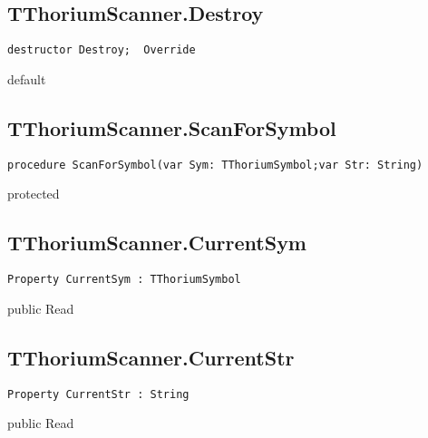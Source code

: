 \subsection{TThoriumScanner.Destroy}
\label{thoriumcorepkg:thorium:tthoriumscanner:destroy}
\begin{FPCList}
\Declaration 

\begin{verbatim}
destructor Destroy;  Override
\end{verbatim}
\Visibility
default
\end{FPCList}
\subsection{TThoriumScanner.ScanForSymbol}
\label{thoriumcorepkg:thorium:tthoriumscanner:scanforsymbol}
\begin{FPCList}
\Declaration 

\begin{verbatim}
procedure ScanForSymbol(var Sym: TThoriumSymbol;var Str: String)
\end{verbatim}
\Visibility
protected
\end{FPCList}
\subsection{TThoriumScanner.CurrentSym}
\label{thoriumcorepkg:thorium:tthoriumscanner:currentsym}
\begin{FPCList}
\Declaration 

\begin{verbatim}
Property CurrentSym : TThoriumSymbol
\end{verbatim}
\Visibility
public
\Access
Read
\end{FPCList}
\subsection{TThoriumScanner.CurrentStr}
\label{thoriumcorepkg:thorium:tthoriumscanner:currentstr}
\begin{FPCList}
\Declaration 

\begin{verbatim}
Property CurrentStr : String
\end{verbatim}
\Visibility
public
\Access
Read
\end{FPCList}
